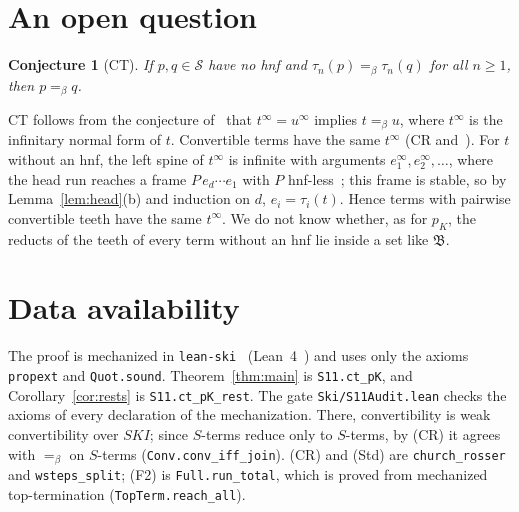 \documentclass[11pt]{amsart}
\newtheorem{conjecture}[theorem]{Conjecture}
\theoremstyle{definition}
\newcommand{\Ter}{\mathcal S}
\newcommand{\conv}{=_\beta}
\newcommand{\pK}{p_K}
\newcommand{\B}{\mathfrak B}
\begin{document}
\section{An open question}\label{sec:open}

\begin{conjecture}[CT]
If $p,q\in\Ter$ have no hnf and $\tau_n(p)\conv\tau_n(q)$ for all $n\ge1$, then $p\conv q$.
\end{conjecture}

\noindent CT follows from the conjecture of~\citep{s6} that $t^\infty=u^\infty$ implies $t\conv u$,
where $t^\infty$ is the infinitary normal form of $t$. Convertible terms have the same $t^\infty$ (CR
and~\citep[Theorem~7]{s3}). For $t$ without an hnf, the left spine of $t^\infty$ is infinite with
arguments $e_1^\infty,e_2^\infty,\dots$, where the head run reaches a frame $P\,e_d\cdots e_1$ with $P$
hnf-less~\citep[Proposition~9(b)]{s3}; this frame is stable, so by Lemma~\ref{lem:head}(b) and induction
on $d$, $e_i=\tau_i(t)$. Hence terms with pairwise convertible teeth have the same $t^\infty$. We do
not know whether, as for $\pK$, the reducts of the teeth of every term without an hnf lie inside a
set like $\B$.

\section*{Data availability}
\sloppy
The proof is mechanized in \texttt{lean-ski}~\citep{leanski} (Lean~4~\citep{lean4}) and uses only
the axioms \texttt{propext} and \texttt{Quot.sound}. Theorem~\ref{thm:main} is \texttt{S11.ct\_pK},
and Corollary~\ref{cor:rests} is \texttt{S11.ct\_pK\_rest}. The gate \texttt{Ski/S11Audit.lean}
checks the axioms of every declaration of the mechanization. There, convertibility is weak
convertibility over $SKI$; since $S$-terms reduce only to $S$-terms, by (CR) it agrees with $\conv$
on $S$-terms (\texttt{Conv.conv\_iff\_join}). (CR) and (Std) are \texttt{church\_rosser} and
\texttt{wsteps\_split}; (F2) is \texttt{Full.run\_total}, which is proved from mechanized
top-termination (\texttt{TopTerm.reach\_all}).



\end{document}
